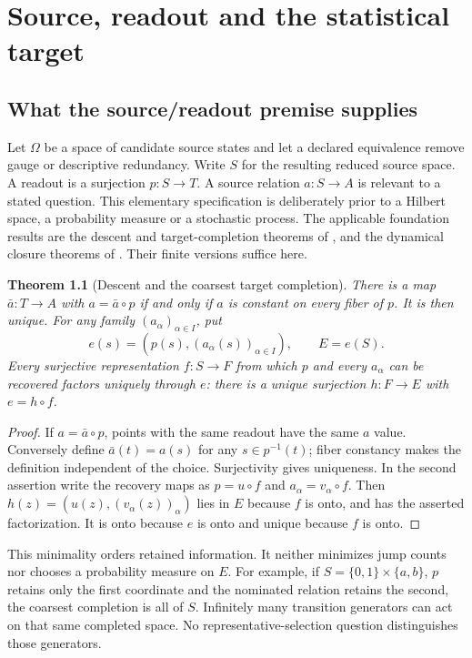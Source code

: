 \documentclass[11pt,oneside,openany]{book}
\newtheorem{theorem}{Theorem}[chapter]
\theoremstyle{definition}
\theoremstyle{remark}\newtheorem{remark}[theorem]{Remark}
\begin{document}
\chapter{Source, readout and the statistical target}
\label{found:chapter}

\section{What the source/readout premise supplies}
Let $\Omega$ be a space of candidate source states and let a declared equivalence remove gauge or descriptive redundancy. Write $S$ for the resulting reduced source space. A readout is a surjection $p:S\to T$. A source relation $a:S\to A$ is relevant to a stated question. This elementary specification is deliberately prior to a Hilbert space, a probability measure or a stochastic process. The applicable foundation results are the descent and target-completion theorems of \cite{F01,F02,F03}, and the dynamical closure theorems of \cite{F05,F06}. Their finite versions suffice here.

\begin{theorem}[Descent and the coarsest target completion]\label{found:descent}
There is a map $\bar a:T\to A$ with $a=\bar a\circ p$ if and only if $a$ is constant on every fiber of $p$. It is then unique. For any family $(a_\alpha)_{\alpha\in I}$, put
\[
 e(s)=(p(s),(a_\alpha(s))_{\alpha\in I}),\qquad E=e(S).
\]
Every surjective representation $f:S\to F$ from which $p$ and every $a_\alpha$ can be recovered factors uniquely through $e$: there is a unique surjection $h:F\to E$ with $e=h\circ f$.
\end{theorem}
\begin{proof}
If $a=\bar a\circ p$, points with the same readout have the same $a$ value. Conversely define $\bar a(t)=a(s)$ for any $s\in p^{-1}(t)$; fiber constancy makes the definition independent of the choice. Surjectivity gives uniqueness. In the second assertion write the recovery maps as $p=u\circ f$ and $a_\alpha=v_\alpha\circ f$. Then $h(z)=(u(z),(v_\alpha(z))_\alpha)$ lies in $E$ because $f$ is onto, and has the asserted factorization. It is onto because $e$ is onto and unique because $f$ is onto.
\end{proof}

This minimality orders retained information. It neither minimizes jump counts nor chooses a probability measure on $E$. For example, if $S=\{0,1\}\times\{a,b\}$, $p$ retains only the first coordinate and the nominated relation retains the second, the coarsest completion is all of $S$. Infinitely many transition generators can act on that same completed space. No representative-selection question distinguishes those generators.
\end{document}
